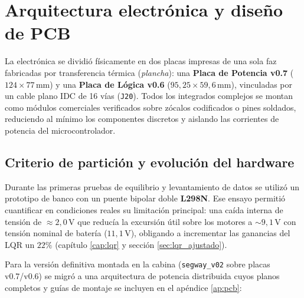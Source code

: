 \documentclass[11pt,a4paper]{report}
\newcommand{\ud}[1]{\,\mathrm{#1}}
\begin{document}
\chapter{Arquitectura electrónica y diseño de PCB}\label{cap:elec}

\begin{idea}
La electrónica se dividió físicamente en dos placas impresas de una sola faz fabricadas por
transferencia térmica (\emph{plancha}): una \textbf{Placa de Potencia v0.7} ($124 \times 77\ud{mm}$)
y una \textbf{Placa de Lógica v0.6} ($95{,}25 \times 59{,}6\ud{mm}$), vinculadas por un cable
plano IDC de 16 vías (\texttt{J20}). Todos los integrados complejos se montan como módulos
comerciales verificados sobre zócalos codificados o pines soldados, reduciendo al mínimo los
componentes discretos y aislando las corrientes de potencia del microcontrolador.
\end{idea}

\section{Criterio de partición y evolución del hardware}

Durante las primeras pruebas de equilibrio y levantamiento de datos se utilizó un prototipo
de banco con un puente bipolar doble \textbf{L298N}. Ese ensayo permitió cuantificar en
condiciones reales su limitación principal: una caída interna de tensión de $\approx 2{,}0\ud{V}$
que reducía la excursión útil sobre los motores a $\sim 9{,}1\ud{V}$ con tensión nominal de
batería ($11{,}1\ud{V}$), obligando a incrementar las ganancias del LQR un $22\%$ (capítulo
\ref{cap:lqr} y sección \ref{sec:lqr_ajustado}).

Para la versión definitiva montada en la cabina (\texttt{segway\_v02} sobre placas v0.7/v0.6) se
migró a una arquitectura de potencia distribuida cuyos planos completos y guías de montaje se
incluyen en el apéndice \ref{ap:pcb}:
\end{document}
